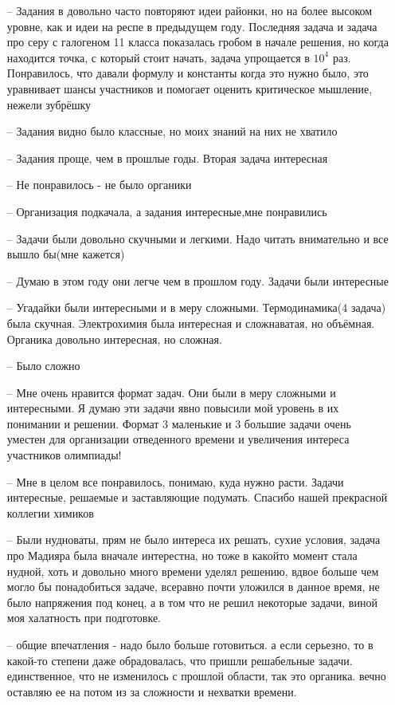 \begin{itemize}
    \itemsep-0.2em
    \item[--] Задания в довольно часто повторяют идеи районки, но на более высоком уровне, как и идеи на респе в предыдущем году. Последняя задача и задача про серу с галогеном 11 класса показалась гробом в начале решения, но когда находится точка, с который стоит начать, задача упрощается в $10^4$ раз. Понравилось, что давали формулу и константы когда это нужно было, это уравнивает шансы участников и помогает оценить критическое мышление, нежели зубрёшку
    \item[--] Задания видно было классные, но моих знаний на них не хватило 
    \item[--] Задания проще, чем в прошлые годы. Вторая задача интересная
    \item[--] Не понравилось - не было органики
    \item[--] Организация подкачала, а задания интересные,мне понравились
    \item[--] Задачи были довольно скучными и легкими. Надо читать внимательно и все вышло бы(мне кажется)
    \item[--] Думаю в этом году они легче чем в прошлом году. Задачи были интересные
    \item[--] Угадайки были интересными и в меру сложными. Термодинамика(4 задача) была скучная. Электрохимия была интересная и сложнаватая, но объёмная. Органика довольно интересная, но сложная.
    \item[--] Было сложно
    \item[--] Мне очень нравится формат задач. Они были в меру сложными и интересными. Я думаю эти задачи явно повысили мой уровень в их понимании и решении. Формат 3 маленькие и 3 большие задачи очень уместен для организации отведенного времени и увеличения интереса участников олимпиады!
    \item[--] Мне в целом все понравилось, понимаю, куда нужно расти. Задачи интересные, решаемые и заставляющие подумать. Спасибо нашей прекрасной коллегии химиков 
    \item[--] Были нудноваты, прям не было интереса их решать, сухие условия, задача про Мадияра была вначале интерестна, но тоже в какойто момент стала нудной, хоть и довольно много времени уделял решению, вдвое больше чем могло бы понадобиться задаче, всеравно почти уложился в данное время, не было напряжения под конец, а в том что не решил некоторые задачи, виной моя халатность при подготовке.
    \item[--] общие впечатления - надо было больше готовиться. а если серьезно, то в какой-то степени даже обрадовалась, что пришли решабельные задачи. единственное, что не изменилось с прошлой области, так это органика. вечно оставляю ее на потом из за сложности и нехватки времени.

\end{itemize}
